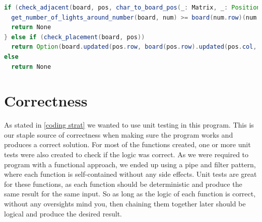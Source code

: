 \documentclass[12pt]{article}
\begin{document}
\pagebreak
\begin{lstlisting}[language={Java}, basicstyle=\ttfamily\tiny, label={lst:check_adj}, caption={Code from place\_light function}]
if (check_adjacent(board, pos, char_to_board_pos(_: Matrix, _: Position, check_tile_if_num)).exists(num => {
  get_number_of_lights_around_number(board, num) >= board(num.row)(num.col).asDigit})) {
  return None
} else if (check_placement(board, pos))
  return Option(board.updated(pos.row, board(pos.row).updated(pos.col, Light)))
else
  return None
\end{lstlisting}


\section{Correctness}

As stated in \ref{coding strat} we wanted to use unit testing in this program. This is our staple source of correctness when making sure the program works and produces a correct solution. For most of the functions created, one or more unit tests were also created to check if the logic was correct. As we were required to program with a functional approach, we ended up using a pipe and filter pattern, where each function is self-contained without any side effects. Unit tests are great for these functions, as each function should be deterministic and produce the same result for the same input. So as long as the logic of each function is correct, without any oversights mind you, then chaining them together later should be logical and produce the desired result. 

\end{document}
